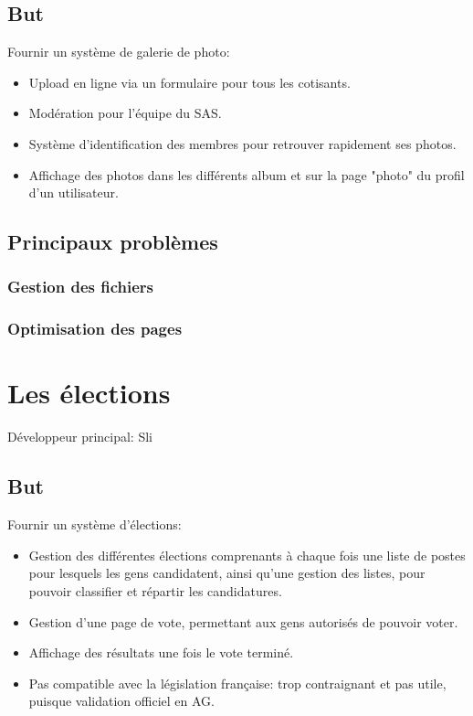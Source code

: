 \documentclass[a4paper]{report}
\begin{document}
\section{But}
\label{sub:but}
\par Fournir un système de galerie de photo:
\begin{itemize}
    \item Upload en ligne via un formulaire pour tous les cotisants.
    \item Modération pour l'équipe du SAS.
    \item Système d'identification des membres pour retrouver rapidement ses photos.
    \item Affichage des photos dans les différents album et sur la page "photo" du profil d'un utilisateur.
\end{itemize}

\section{Principaux problèmes}
\label{sec:principaux_problemes}

\subsection{Gestion des fichiers}
\label{sub:gestion_des_fichiers}

\subsection{Optimisation des pages}
\label{sub:optimisation_des_pages}


\chapter{Les élections}
\label{sec:les_elections}
\par Développeur principal: Sli

\section{But}
\label{sub:but}
\par Fournir un système d'élections:
\begin{itemize}
    \item Gestion des différentes élections comprenants à chaque fois une liste de postes pour lesquels les gens
        candidatent, ainsi qu'une gestion des listes, pour pouvoir classifier et répartir les candidatures.
    \item Gestion d'une page de vote, permettant aux gens autorisés de pouvoir voter.
    \item Affichage des résultats une fois le vote terminé.
    \item Pas compatible avec la législation française: trop contraignant et pas utile, puisque validation officiel en
        AG.
\end{itemize}
\end{document}
